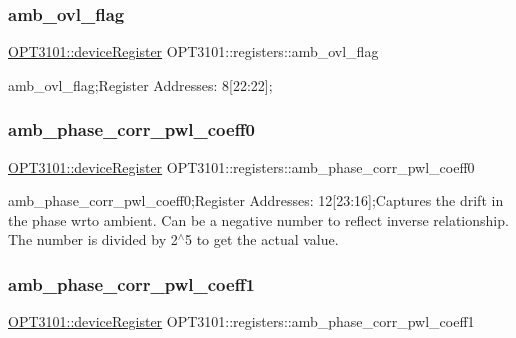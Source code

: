 \subsubsection{\texorpdfstring{amb\+\_\+ovl\+\_\+flag}{amb\_ovl\_flag}}
{\footnotesize\ttfamily \mbox{\hyperlink{class_o_p_t3101_1_1device_register}{O\+P\+T3101\+::device\+Register}} O\+P\+T3101\+::registers\+::amb\+\_\+ovl\+\_\+flag}



amb\+\_\+ovl\+\_\+flag;Register Addresses\+: 8\mbox{[}22\+:22\mbox{]}; 

\mbox{\label{class_o_p_t3101_1_1registers_a3a959d073208e7bc1859551052620c33}} 
\subsubsection{\texorpdfstring{amb\+\_\+phase\+\_\+corr\+\_\+pwl\+\_\+coeff0}{amb\_phase\_corr\_pwl\_coeff0}}
{\footnotesize\ttfamily \mbox{\hyperlink{class_o_p_t3101_1_1device_register}{O\+P\+T3101\+::device\+Register}} O\+P\+T3101\+::registers\+::amb\+\_\+phase\+\_\+corr\+\_\+pwl\+\_\+coeff0}



amb\+\_\+phase\+\_\+corr\+\_\+pwl\+\_\+coeff0;Register Addresses\+: 12\mbox{[}23\+:16\mbox{]};Captures the drift in the phase wrto ambient. Can be a negative number to reflect inverse relationship. The number is divided by 2$^\wedge$5 to get the actual value. 

\mbox{\label{class_o_p_t3101_1_1registers_aa5317aa50442b1842ac91e54626e0455}} 
\subsubsection{\texorpdfstring{amb\+\_\+phase\+\_\+corr\+\_\+pwl\+\_\+coeff1}{amb\_phase\_corr\_pwl\_coeff1}}
{\footnotesize\ttfamily \mbox{\hyperlink{class_o_p_t3101_1_1device_register}{O\+P\+T3101\+::device\+Register}} O\+P\+T3101\+::registers\+::amb\+\_\+phase\+\_\+corr\+\_\+pwl\+\_\+coeff1}



